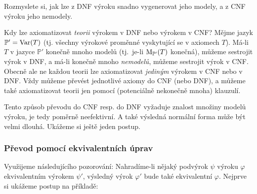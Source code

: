 \begin{exercise}
Rozmyslete si, jak lze z DNF výroku snadno vygenerovat jeho modely, a z CNF výroku jeho nemodely.
\end{exercise}

\begin{remark}
    Kdy lze axiomatizovat \emph{teorii} výrokem v DNF nebo výrokem v CNF? Mějme jazyk $\mathbb P'=\operatorname{Var}(T)$ (tj. všechny výrokové proměnné vyskytující se v axiomech $T$). Má-li $T$ v jazyce $\mathbb P'$ konečně mnoho modelů (tj.\ je-li $\operatorname{M}_{\mathbb P'}(T)$ konečná), můžeme sestrojit výrok v DNF, a má-li konečně mnoho \emph{nemodelů}, můžeme sestrojit výrok v CNF. Obecně ale ne každou teorii lze axiomatizovat \emph{jediným} výrokem v CNF nebo v DNF. Vždy můžeme převést jednotlivé axiomy do CNF (nebo DNF), a můžeme také axiomatizovat teorii jen pomocí (potenciálně nekonečně mnoha) klauzulí.
\end{remark}

Tento způsob převodu do CNF resp. do DNF vyžaduje znalost množiny modelů výroku, je tedy poměrně neefektivní. A také výsledná normální forma může být velmi dlouhá. Ukážeme si ještě jeden postup.

\subsubsection{Převod pomocí ekvivalentních úprav}

Využijeme následujícího pozorování: Nahradíme-li nějaký podvýrok $\psi$ výroku $\varphi$ ekvivalentním výrokem $\psi'$, výsledný výrok $\varphi'$ bude také ekvivalentní $\varphi$. Nejprve si ukážeme postup na příkladě:

